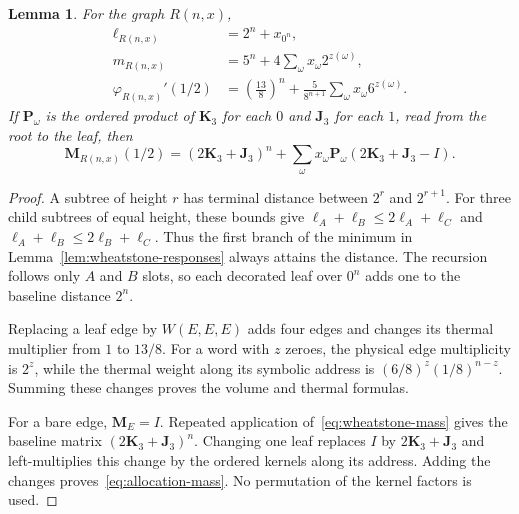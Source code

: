 \documentclass[scheme=plain,11pt]{ctexart}
\newtheorem{lemma}[theorem]{Lemma}
\theoremstyle{definition}
\theoremstyle{remark}
\begin{document}
\begin{lemma}\label{lem:allocation-formulas}
For the graph $R(n,x)$,
\begin{align}
 \ell_{R(n,x)}&=2^n+x_{0^n},\label{eq:allocation-length}\\
 m_{R(n,x)}&=5^n+4\sum_{\omega}x_\omega2^{z(\omega)},\label{eq:allocation-volume}\\
 \varphi_{R(n,x)}'(1/2)
 &=\left(\frac{13}{8}\right)^n
   +\frac5{8^{n+1}}\sum_{\omega}x_\omega6^{z(\omega)}.\label{eq:allocation-thermal}
\end{align}
If $\mathbf P_\omega$ is the ordered product of $\mathbf K_3$ for each $0$ and $\mathbf J_3$ for each $1$, read from the root to the leaf, then
\begin{equation}\label{eq:allocation-mass}
 \mathbf M_{R(n,x)}(1/2)
 =(2\mathbf K_3+\mathbf J_3)^n+
 \sum_\omega x_\omega\mathbf P_\omega
 (2\mathbf K_3+\mathbf J_3-I).
\end{equation}
\end{lemma}
\begin{proof}
A subtree of height $r$ has terminal distance between $2^r$ and $2^{r+1}$. For three child subtrees of equal height, these bounds give $\ell_A+\ell_B\le2\ell_A+\ell_C$ and $\ell_A+\ell_B\le2\ell_B+\ell_C$. Thus the first branch of the minimum in Lemma~\ref{lem:wheatstone-responses} always attains the distance. The recursion follows only $A$ and $B$ slots, so each decorated leaf over $0^n$ adds one to the baseline distance $2^n$.

Replacing a leaf edge by $W(E,E,E)$ adds four edges and changes its thermal multiplier from $1$ to $13/8$. For a word with $z$ zeroes, the physical edge multiplicity is $2^z$, while the thermal weight along its symbolic address is $(6/8)^z(1/8)^{n-z}$. Summing these changes proves the volume and thermal formulas.

For a bare edge, $\mathbf M_E=I$. Repeated application of~\eqref{eq:wheatstone-mass} gives the baseline matrix $(2\mathbf K_3+\mathbf J_3)^n$. Changing one leaf replaces $I$ by $2\mathbf K_3+\mathbf J_3$ and left-multiplies this change by the ordered kernels along its address. Adding the changes proves~\eqref{eq:allocation-mass}. No permutation of the kernel factors is used.
\end{proof}
\end{document}
